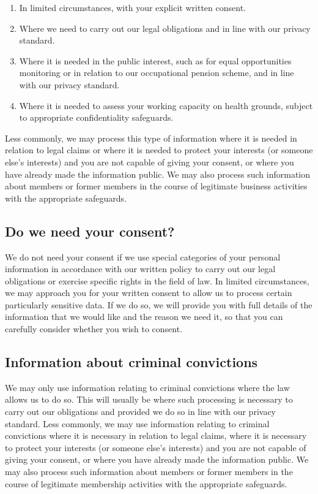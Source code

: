 \documentclass[12pt]{article}
\begin{document}
\begin{enumerate}
\item In limited circumstances, with your explicit written consent.
\item Where we need to carry out our legal obligations and in line with our privacy standard.
\item Where it is needed in the public interest, such as for equal opportunities monitoring or in relation to our occupational pension scheme, and in line with our privacy standard.
\item Where it is needed to assess your working capacity on health grounds, subject to appropriate confidentiality safeguards.
\end{enumerate}
Less commonly, we may process this type of information where it is needed in relation to legal claims or where it is needed to protect your interests (or someone else's interests) and you are not capable of giving your consent, or where you have already made the information public. We may also process such information about members or former members in the course of legitimate business activities with the appropriate safeguards.

\subsection{Do we need your consent?}
We do not need your consent if we use special categories of your personal information in accordance with our written policy to carry out our legal obligations or exercise specific rights in the field of law. In limited circumstances, we may approach you for your written consent to allow us to process certain particularly sensitive data. If we do so, we will provide you with full details of the information that we would like and the reason we need it, so that you can carefully consider whether you wish to consent. 

\subsection{Information about criminal convictions}
We may only use information relating to criminal convictions where the law allows us to do so. This will usually be where such processing is necessary to carry out our obligations and provided we do so in line with our privacy standard.
Less commonly, we may use information relating to criminal convictions where it is necessary in relation to legal claims, where it is necessary to protect your interests (or someone else's interests) and you are not capable of giving your consent, or where you have already made the information public. 
We may also process such information about members or former members in the course of legitimate membership activities with the appropriate safeguards.
\end{document}
